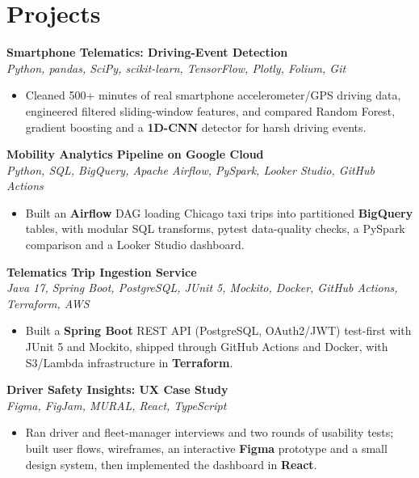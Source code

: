 \documentclass[10pt,letterpaper]{article}
\newcommand{\project}[2]{\textbf{#1}\\\textit{#2}\par}
\begin{document}
\section*{Projects}
\project{Smartphone Telematics: Driving-Event Detection}{Python, pandas, SciPy, scikit-learn, TensorFlow, Plotly, Folium, Git}
\begin{itemize}\item Cleaned 500+ minutes of real smartphone accelerometer/GPS driving data, engineered filtered sliding-window features, and compared Random Forest, gradient boosting and a \textbf{1D-CNN} detector for harsh driving events.\end{itemize}\vspace{2pt}
\project{Mobility Analytics Pipeline on Google Cloud}{Python, SQL, BigQuery, Apache Airflow, PySpark, Looker Studio, GitHub Actions}
\begin{itemize}\item Built an \textbf{Airflow} DAG loading Chicago taxi trips into partitioned \textbf{BigQuery} tables, with modular SQL transforms, pytest data-quality checks, a PySpark comparison and a Looker Studio dashboard.\end{itemize}\vspace{2pt}
\project{Telematics Trip Ingestion Service}{Java 17, Spring Boot, PostgreSQL, JUnit 5, Mockito, Docker, GitHub Actions, Terraform, AWS}
\begin{itemize}\item Built a \textbf{Spring Boot} REST API (PostgreSQL, OAuth2/JWT) test-first with JUnit 5 and Mockito, shipped through GitHub Actions and Docker, with S3/Lambda infrastructure in \textbf{Terraform}.\end{itemize}\vspace{2pt}
\project{Driver Safety Insights: UX Case Study}{Figma, FigJam, MURAL, React, TypeScript}
\begin{itemize}\item Ran driver and fleet-manager interviews and two rounds of usability tests; built user flows, wireframes, an interactive \textbf{Figma} prototype and a small design system, then implemented the dashboard in \textbf{React}.\end{itemize}\vspace{2pt}
\end{document}
